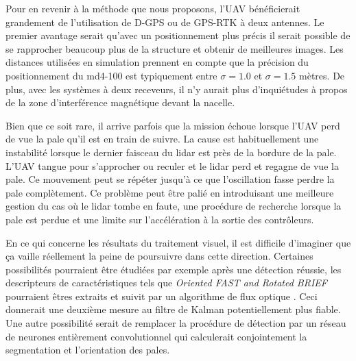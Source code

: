 Pour en revenir à la méthode que nous proposons, l'UAV bénéficierait grandement de l'utilisation de D-GPS ou de GPS-RTK à deux antennes. Le premier avantage serait qu’avec un positionnement plus précis il serait possible de se rapprocher beaucoup plus de la structure et obtenir de meilleures images. Les distances utilisées en simulation prennent en compte que la précision du positionnement du md4-100 est typiquement entre $\sigma = 1.0$ et $\sigma = 1.5$ mètres. De plus, avec les systèmes à deux receveurs, il n'y aurait plus d'inquiétudes à propos de la zone d'interférence magnétique devant la nacelle.

Bien que ce soit rare, il arrive parfois que la mission échoue lorsque l'UAV perd de vue la pale qu'il est en train de suivre. La cause est habituellement une instabilité lorsque le dernier faisceau du lidar est près de la bordure de la pale. L'UAV tangue pour s'approcher ou reculer et le lidar perd et regagne de vue la pale. Ce mouvement peut se répéter jusqu'à ce que l'oscillation fasse perdre la pale complètement. Ce problème peut être palié en introduisant une meilleure gestion du cas où le lidar tombe en faute, une procédure de recherche lorsque la pale est perdue et une limite sur l'accélération à la sortie des contrôleurs.

En ce qui concerne les résultats du traitement visuel, il est difficile d'imaginer que ça vaille réellement la peine de poursuivre dans cette direction. Certaines possibilités pourraient être étudiées par exemple après une détection réussie, les descripteurs de caractéristiques tels que \textit{Oriented FAST and Rotated BRIEF} \citep{Rublee2011} pourraient êtres extraits et suivit par un algorithme de flux optique \citep{Lucas1981}. Ceci donnerait une deuxième mesure au filtre de Kalman potentiellement plus fiable. Une autre possibilité serait de remplacer la procédure de détection par un réseau de neurones entièrement convolutionnel qui calculerait conjointement la segmentation et l'orientation des pales.



